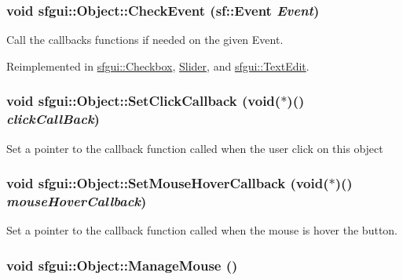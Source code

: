 \hypertarget{classsfgui_1_1Object_cd9dbf2abe79e04c22f281bccb8bdb0e}{
\subsubsection[CheckEvent]{\setlength{\rightskip}{0pt plus 5cm}void sfgui::Object::CheckEvent (sf::Event {\em Event})}}
\label{classsfgui_1_1Object_cd9dbf2abe79e04c22f281bccb8bdb0e}




Call the callbacks functions if needed on the given Event. 

Reimplemented in \hyperlink{classsfgui_1_1Checkbox_d618a9010bef60b8ea2f11f893320fb8}{sfgui::Checkbox}, \hyperlink{classSlider_29b1b660a47bd4c2e2baaedf02a072c3}{Slider}, and \hyperlink{classsfgui_1_1TextEdit_af6d4be3633d3eb8bcc7a1007e324da8}{sfgui::TextEdit}.\hypertarget{classsfgui_1_1Object_d3d20a4cccde599748db724236ca0826}{
\subsubsection[SetClickCallback]{\setlength{\rightskip}{0pt plus 5cm}void sfgui::Object::SetClickCallback (void($\ast$)() {\em clickCallBack})}}
\label{classsfgui_1_1Object_d3d20a4cccde599748db724236ca0826}




Set a pointer to the callback function called when the user click on this object \hypertarget{classsfgui_1_1Object_8317dbdf44797dd69de490d4b946ed83}{
\subsubsection[SetMouseHoverCallback]{\setlength{\rightskip}{0pt plus 5cm}void sfgui::Object::SetMouseHoverCallback (void($\ast$)() {\em mouseHoverCallback})}}
\label{classsfgui_1_1Object_8317dbdf44797dd69de490d4b946ed83}




Set a pointer to the callback function called when the mouse is hover the button. \hypertarget{classsfgui_1_1Object_3332575d988f9eee589f57b2ad516593}{
\subsubsection[ManageMouse]{\setlength{\rightskip}{0pt plus 5cm}void sfgui::Object::ManageMouse ()}}
\label{classsfgui_1_1Object_3332575d988f9eee589f57b2ad516593}




